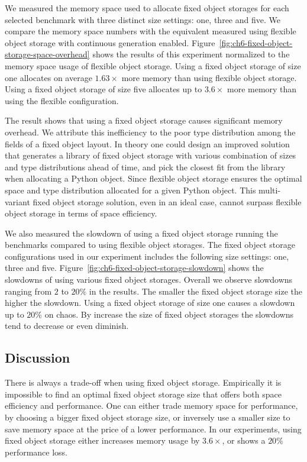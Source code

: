 We measured the memory space used to allocate fixed object storages for each selected benchmark with three distinct size settings: one, three and five.
We compare the memory space numbers with the equivalent measured using flexible object storage with continuous generation enabled.
Figure~\ref{fig:ch6-fixed-object-storage-space-overhead} shows the results of this experiment normalized to the memory space usage of flexible object storage.
Using a fixed object storage of size one allocates on average $1.63\times$ more memory than using flexible object storage.
Using a fixed object storage of size five allocates up to $3.6\times$ more memory than using the flexible configuration.

The result shows that using a fixed object storage causes significant memory overhead.
We attribute this inefficiency to the poor type distribution among the fields of a fixed object layout.
In theory one could design an improved solution that generates a library of fixed object storage with various combination of sizes and type distributions ahead of time, and pick the closest fit from the library when allocating a Python object.
Since flexible object storage ensures the optimal space and type distribution allocated for a given Python object.
This multi-variant fixed object storage solution, even in an ideal case, cannot surpass flexible object storage in terms of space efficiency.

We also measured the slowdown of using a fixed object storage running the benchmarks compared to using flexible object storages.
The fixed object storage configurations used in our experiment includes the following size settings: one, three and five.
Figure~\ref{fig:ch6-fixed-object-storage-slowdown} shows the slowdowns of using various fixed object storages.
Overall we observe slowdowns ranging from $2$ to $20\%$ in the results.
The smaller the fixed object storage size the higher the slowdown.
Using a fixed object storage of size one causes a slowdown up to $20\%$ on \textsf{chaos}.
By increase the size of fixed object storages the slowdowns tend to decrease or even diminish.

\subsection{Discussion}

There is always a trade-off when using fixed object storage.
Empirically it is impossible to find an optimal fixed object storage size that offers both space efficiency and performance.
One can either trade memory space for performance, by choosing a bigger fixed object storage size,
or inversely use a smaller size to save memory space at the price of a lower performance.
In our experiments, using fixed object storage either increases memory usage by $3.6\times$, or shows a $20\%$ performance loss.

